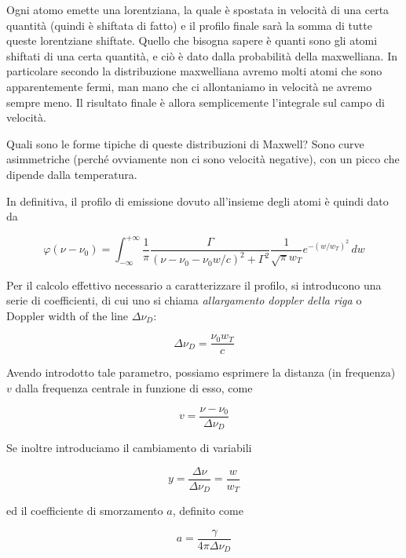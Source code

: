 

Ogni atomo emette una lorentziana, la quale è spostata in velocità di una certa quantità (quindi è shiftata di fatto) e il profilo finale sarà la somma di tutte queste lorentziane shiftate. Quello che bisogna sapere è quanti sono gli atomi shiftati di una certa quantità, e ciò è dato dalla probabilità della maxwelliana. In particolare secondo la distribuzione maxwelliana avremo molti atomi che sono apparentemente fermi, man mano che ci allontaniamo in velocità ne avremo sempre meno. Il risultato finale è allora semplicemente l'integrale sul campo di velocità.

Quali sono le forme tipiche di queste distribuzioni di Maxwell? Sono curve asimmetriche (perché ovviamente non ci sono velocità negative), con un picco che dipende dalla temperatura.

In definitiva, il profilo di emissione dovuto all'insieme degli atomi è quindi dato da

\begin{equation*}
  \varphi(\nu - \nu_0)=\int_{-\infty}^{+\infty} \frac{1}{\pi} \frac{\Gamma}{(\nu - \nu_0 - \nu_0 w/c)^2 + \Gamma^2} \frac{1}{\sqrt{\pi} w_T} e^{-(w/w_T)^2} \, dw
\end{equation*}

Per il calcolo effettivo necessario a caratterizzare il profilo, si introducono una serie di coefficienti, di cui uno si chiama \textit{allargamento doppler della riga} o Doppler width of the line $\Delta \nu_D$:


$$\Delta \nu_D=\frac{\nu_0 w_T}{c}$$

Avendo introdotto tale parametro, possiamo esprimere la distanza (in frequenza) $v$ dalla frequenza centrale in funzione di esso, come

$$v=\frac{\nu - \nu_0}{\Delta \nu_{D}}$$

Se inoltre introduciamo il cambiamento di variabili

$$y=\frac{\Delta \nu}{\Delta \nu_{D}}=\frac{w}{w_T}$$

ed il coefficiente di smorzamento $a$, definito come

$$a=\frac{\gamma}{4 \pi \Delta \nu_{D}}$$

